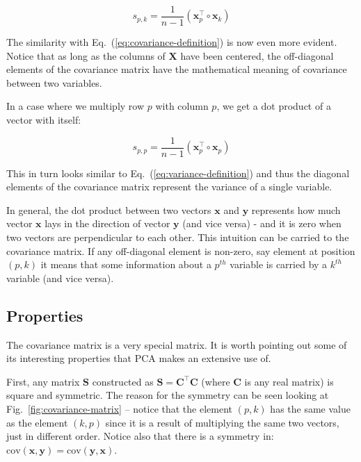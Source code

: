 \documentclass[10pt,twocolumn]{article}
\begin{document}
\begin{equation}
s_{p,k} = \frac{1}{n-1} (\mathbf{x}_p^{\top} \circ \mathbf{x}_k)
\end{equation}

The similarity with Eq.~(\ref{eq:covariance-definition}) is now even more evident. Notice that as long as the columns of $\mathbf{X}$ have been centered, the off-diagonal elements of the covariance matrix have the mathematical meaning of covariance between two variables.

In a case where we multiply row $p$ with column $p$, we get a dot product of a vector with itself:

\begin{equation}
s_{p,p} = \frac{1}{n-1} ( \mathbf{x}_p^{\top} \circ \mathbf{x}_p)
\end{equation}

This in turn looks similar to Eq.~(\ref{eq:variance-definition}) and thus the diagonal elements of the covariance matrix represent the variance of a single variable.

In general, the dot product between two vectors $\mathbf{x}$ and $\mathbf{y}$ represents how much vector $\mathbf{x}$ lays in the direction of vector $\mathbf{y}$ (and vice versa) - and it is zero when two vectors are perpendicular to each other. This intuition can be carried to the covariance matrix. If any off-diagonal element is non-zero, say element at position $(p,k)$ it means that some information about a $p^{th}$ variable is carried by a $k^{th}$ variable (and vice versa).

\subsection{Properties} \label{sec:covariance-properties}

The covariance matrix is a very special matrix. It is worth pointing out some of its interesting properties that PCA makes an extensive use of.

First, any matrix $\mathbf{S}$ constructed as $\mathbf{S} = \mathbf{C}^{\top} \mathbf{C}$ (where $\mathbf{C}$ is any real matrix) is square and symmetric. The reason for the symmetry can be seen looking at Fig.~\ref{fig:covariance-matrix} -- notice that the element $(p,k)$ has the same value as the element $(k,p)$ since it is a result of multiplying the same two vectors, just in different order. Notice also that there is a symmetry in: $\text{cov}(\mathbf{x},\mathbf{y}) = \text{cov}(\mathbf{y},\mathbf{x})$. 
\end{document}
